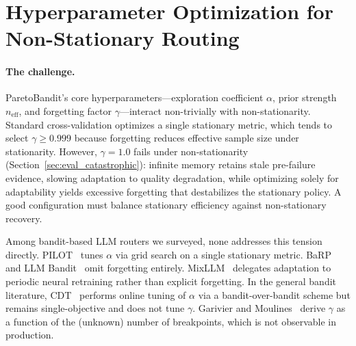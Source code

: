 
\section{Hyperparameter Optimization for Non-Stationary Routing}
\label{sec:hparam_sweep}
\FloatBarrier

\paragraph{The challenge.}
ParetoBandit's core hyperparameters---exploration coefficient
$\alpha$, prior strength $n_{\text{eff}}$, and forgetting factor
$\gamma$---interact non-trivially with non-stationarity.
Standard cross-validation optimizes a single stationary metric,
which tends to select $\gamma \geq 0.999$ because forgetting
reduces effective sample size under stationarity.
However, $\gamma{=}1.0$ fails under non-stationarity
(Section~\ref{sec:eval_catastrophic}): infinite memory retains
stale pre-failure evidence, slowing adaptation to quality
degradation, while optimizing solely for adaptability yields
excessive forgetting that destabilizes the stationary policy.
A good configuration must balance stationary efficiency against
non-stationary recovery.

Among bandit-based LLM routers we surveyed, none addresses this
tension directly.
PILOT~\cite{panda2025pilot} tunes $\alpha$ via grid search on a
single stationary metric.
BaRP~\cite{wang2025barp} and LLM Bandit~\cite{li2025llmbandit}
omit forgetting entirely.
MixLLM~\cite{wang2025mixllm} delegates adaptation to periodic
neural retraining rather than explicit forgetting.
In the general bandit literature,
CDT~\cite{kang2024cdt} performs online tuning of $\alpha$ via a
bandit-over-bandit scheme but remains single-objective and does
not tune $\gamma$.
Garivier and Moulines~\cite{garivier2011switching} derive $\gamma$
as a function of the (unknown) number of breakpoints, which is
not observable in production.

